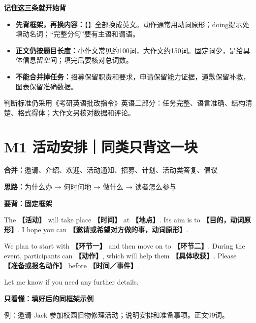 \documentclass[11pt,a4paper,fontset=macnew]{ctexart}
\newenvironment{english}{\begingroup\fontsize{11}{15}\selectfont\setlength{\parskip}{4pt}}{\par\endgroup}
\begin{document}
\par\vspace{5pt}\noindent\textbf{记住这三条就开始背}\par\nopagebreak
\begin{itemize}\item \textbf{先背框架，再换内容：}【】全部换成英文。动作通常用动词原形；doing提示处填动名词；“完整分句”要有主语和谓语。\item \textbf{正文仍按题目长度：}小作文常见约100词，大作文约150词。固定词少，是给具体信息留空间；填完后要核对总词数。\item \textbf{不能合并掉任务：}招募保留职责和要求，申请保留能力证据，道歉保留补救，图表保留准确数据。\end{itemize}
{\small 判断标准仍采用《考研英语批改指令》英语二部分：任务完整、语言准确、结构清楚、格式得体；大作文另核对数据和评论。}\par
\clearpage\section*{M1 活动安排｜同类只背这一块}
{\small\textbf{合并：}邀请、介绍、欢迎、活动通知、招募、计划、活动类答复、倡议\par\textbf{思路：}为什么办 → 何时何地 → 做什么 → 读者怎么参与}\par
\par\vspace{5pt}\noindent\textbf{要背：固定框架}\par\nopagebreak
\begin{english}
The \textbf{【活动】} will take place \textbf{【时间】} at \textbf{【地点】}. Its aim is to \textbf{【目的，动词原形】}. I hope you can \textbf{【邀请或希望对方做的事，动词原形】}.

We plan to start with \textbf{【环节一】} and then move on to \textbf{【环节二】}. During the event, participants can \textbf{【动作】}, which will help them \textbf{【具体收获】}. Please \textbf{【准备或报名动作】} before \textbf{【时间／事件】}.

Let me know if you need any further details.

\end{english}
\par\vspace{5pt}\noindent\textbf{只看懂：填好后的同框架示例}\par\nopagebreak
{\small 例：邀请 Jack 参加校园旧物修理活动；说明安排和准备事项。\quad 正文99词。}\par
\end{document}
